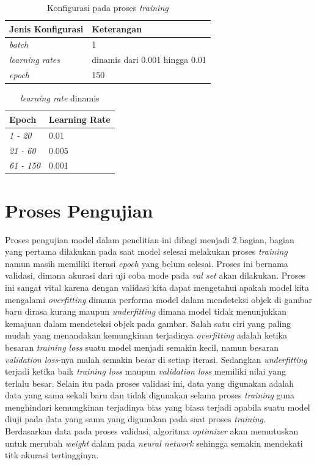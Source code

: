 \begin{table}
  \caption{Konfigurasi pada proses \textit{training}}
  \label{tab:MaskRCCN_config}
  \centering
  \begin{tabular}{ | l | l | }
    \hline
    \textbf{Jenis Konfigurasi} & \textbf{Keterangan} \\ \hline
    \textit{batch}             & 1                   \\ \hline
    \textit{learning rates}    & dinamis dari 0.001 hingga 0.01                \\ \hline
    \textit{epoch}             & 150                   \\ \hline
  \end{tabular}
\end{table}

\begin{table}
  \caption{\textit{learning rate} dinamis}
  \label{tab:lr_config}
  \centering
  \begin{tabular}{ | l | l | }
    \hline
    \textbf{Epoch} & \textbf{Learning Rate} \\ \hline
    \textit{1 - 20}             & 0.01                   \\ \hline
    \textit{21 - 60}    & 0.005                \\ \hline
    \textit{61 - 150}             & 0.001                  \\ \hline
  \end{tabular}
\end{table}

\section{Proses Pengujian}
Proses pengujian model dalam penelitian ini dibagi menjadi 2 bagian, bagian yang pertama dilakukan pada saat 
model selesai melakukan proses \textit{training} namun masih memiliki iterasi \textit{epoch} yang belum selesai. 
Proses ini bernama validasi, dimana akurasi dari uji coba mode pada \textit{val set} akan dilakukan. 
Proses ini sangat vital karena dengan validasi kita dapat mengetahui apakah model 
kita mengalami \textit{overfitting} dimana performa model dalam mendeteksi objek di gambar baru dirasa kurang
maupun \textit{underfitting} dimana model tidak menunjukkan kemajuan dalam mendeteksi objek pada gambar. 
Salah satu ciri yang paling mudah yang 
menandakan kemungkinan terjadinya \textit{overfitting} adalah ketika besaran \textit{training loss} suatu model 
menjadi semakin kecil, namun besaran \textit{validation loss}-nya malah semakin besar di setiap iterasi. 
Sedangkan \textit{underfitting} terjadi ketika baik \textit{training loss} maupun \textit{validation loss} 
memiliki nilai yang terlalu besar. Selain itu pada proses validasi ini, data yang digunakan adalah data yang 
sama sekali baru dan tidak digunakan selama proses \textit{training} guna menghindari kemungkinan terjadinya 
bias yang biasa terjadi apabila suatu model diuji pada data yang sama yang digunakan pada saat proses 
\textit{training}. Berdasarkan data pada proses validasi, algoritma \textit{optimizer} akan memutuskan untuk 
merubah \textit{weight} dalam pada \textit{neural network} sehingga semakin mendekati titk akurasi tertingginya.

